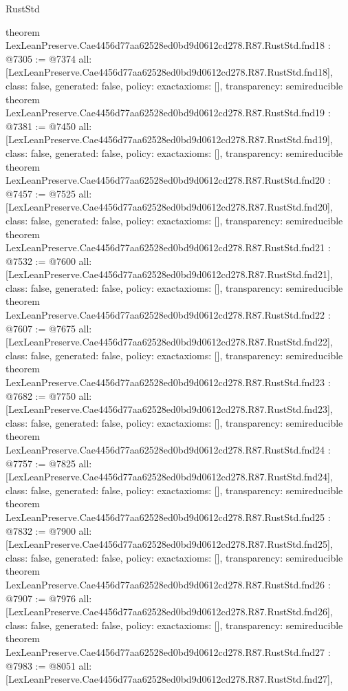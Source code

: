 \begin{lexlean}{RustStd}
\begin{coremodule}
{}
theorem LexLeanPreserve.Cae4456d77aa62528ed0bd9d0612cd278.R87.RustStd.fnd18 : @7305 := @7374 {
  all: [LexLeanPreserve.Cae4456d77aa62528ed0bd9d0612cd278.R87.RustStd.fnd18],
  class: false,
  generated: false,
  policy: exact{axioms: []},
  transparency: semireducible
}
theorem LexLeanPreserve.Cae4456d77aa62528ed0bd9d0612cd278.R87.RustStd.fnd19 : @7381 := @7450 {
  all: [LexLeanPreserve.Cae4456d77aa62528ed0bd9d0612cd278.R87.RustStd.fnd19],
  class: false,
  generated: false,
  policy: exact{axioms: []},
  transparency: semireducible
}
theorem LexLeanPreserve.Cae4456d77aa62528ed0bd9d0612cd278.R87.RustStd.fnd20 : @7457 := @7525 {
  all: [LexLeanPreserve.Cae4456d77aa62528ed0bd9d0612cd278.R87.RustStd.fnd20],
  class: false,
  generated: false,
  policy: exact{axioms: []},
  transparency: semireducible
}
theorem LexLeanPreserve.Cae4456d77aa62528ed0bd9d0612cd278.R87.RustStd.fnd21 : @7532 := @7600 {
  all: [LexLeanPreserve.Cae4456d77aa62528ed0bd9d0612cd278.R87.RustStd.fnd21],
  class: false,
  generated: false,
  policy: exact{axioms: []},
  transparency: semireducible
}
theorem LexLeanPreserve.Cae4456d77aa62528ed0bd9d0612cd278.R87.RustStd.fnd22 : @7607 := @7675 {
  all: [LexLeanPreserve.Cae4456d77aa62528ed0bd9d0612cd278.R87.RustStd.fnd22],
  class: false,
  generated: false,
  policy: exact{axioms: []},
  transparency: semireducible
}
theorem LexLeanPreserve.Cae4456d77aa62528ed0bd9d0612cd278.R87.RustStd.fnd23 : @7682 := @7750 {
  all: [LexLeanPreserve.Cae4456d77aa62528ed0bd9d0612cd278.R87.RustStd.fnd23],
  class: false,
  generated: false,
  policy: exact{axioms: []},
  transparency: semireducible
}
theorem LexLeanPreserve.Cae4456d77aa62528ed0bd9d0612cd278.R87.RustStd.fnd24 : @7757 := @7825 {
  all: [LexLeanPreserve.Cae4456d77aa62528ed0bd9d0612cd278.R87.RustStd.fnd24],
  class: false,
  generated: false,
  policy: exact{axioms: []},
  transparency: semireducible
}
theorem LexLeanPreserve.Cae4456d77aa62528ed0bd9d0612cd278.R87.RustStd.fnd25 : @7832 := @7900 {
  all: [LexLeanPreserve.Cae4456d77aa62528ed0bd9d0612cd278.R87.RustStd.fnd25],
  class: false,
  generated: false,
  policy: exact{axioms: []},
  transparency: semireducible
}
theorem LexLeanPreserve.Cae4456d77aa62528ed0bd9d0612cd278.R87.RustStd.fnd26 : @7907 := @7976 {
  all: [LexLeanPreserve.Cae4456d77aa62528ed0bd9d0612cd278.R87.RustStd.fnd26],
  class: false,
  generated: false,
  policy: exact{axioms: []},
  transparency: semireducible
}
theorem LexLeanPreserve.Cae4456d77aa62528ed0bd9d0612cd278.R87.RustStd.fnd27 : @7983 := @8051 {
  all: [LexLeanPreserve.Cae4456d77aa62528ed0bd9d0612cd278.R87.RustStd.fnd27],
}
\end{coremodule}
\end{lexlean}
